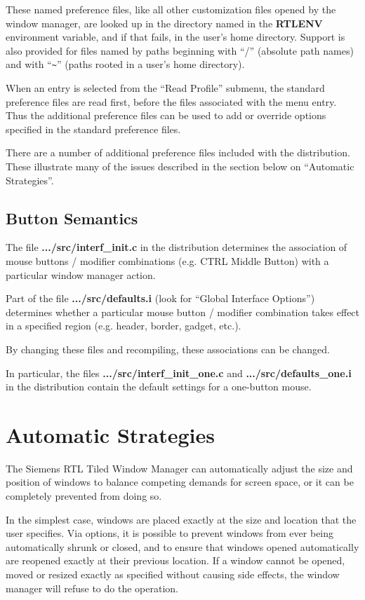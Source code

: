 These named preference files, like all other customization files opened
by the window manager, are looked up in the directory named in the
{\bf RTLENV} environment variable, and if that fails, in the user's home
directory.  Support is also provided for files named by paths beginning
with ``/'' (absolute path names) and with ``\verb+~+'' (paths
rooted in a user's 
home directory).

When an entry is selected from the ``Read Profile'' submenu, the
standard preference files are read first, before the files
associated with the menu entry.
Thus the additional preference files can be used to add or override
options specified in the standard preference files.

There are a number of additional preference files included with the
distribution.  These illustrate many of the issues described in the
section below on ``Automatic Strategies''.

\subsection{Button Semantics}

The file {\bf .../src/interf\_init.c} in the distribution determines the
association of mouse buttons / modifier combinations (e.g. CTRL Middle
Button) with a particular window manager action.

Part of the file {\bf .../src/defaults.i} (look for ``Global Interface
Options'') determines whether a particular mouse
button / modifier combination takes effect in a specified region
(e.g. header, border, gadget, etc.).

By changing these files and recompiling, these associations can be
changed.

In particular, the files {\bf .../src/interf\_init\_one.c} and
{\bf .../src/defaults\_one.i} in the distribution contain the
default settings for a one-button mouse.

\section{Automatic Strategies}

The Siemens RTL Tiled Window Manager can automatically adjust the size
and position of windows to balance competing demands for screen space, or
it can be completely prevented from doing so.

In the simplest case, windows are placed exactly at the size and location
that the user specifies.  Via options, it is possible to prevent windows
from ever being automatically shrunk or closed, and to ensure that
windows opened automatically are reopened exactly at their previous
location.  If a window cannot be opened, moved or resized exactly as
specified without causing side effects, the window manager will refuse to
do the operation.


